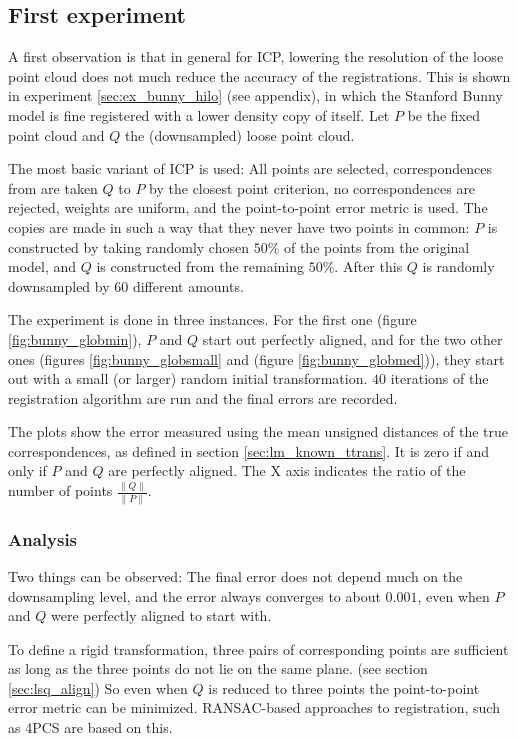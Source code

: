 \subsection{First experiment}
A first observation is that in general for ICP, lowering the resolution of the loose point cloud does not much reduce the accuracy of the registrations. This is shown in experiment \ref{sec:ex_bunny_hilo} (see appendix), in which the Stanford Bunny model is fine registered with a lower density copy of itself. Let $P$ be the fixed point cloud and $Q$ the (downsampled) loose point cloud.

The most basic variant of ICP is used: All points are selected, correspondences from are taken $Q$ to $P$ by the closest point criterion, no correspondences are rejected, weights are uniform, and the point-to-point error metric is used. The copies are made in such a way that they never have two points in common: $P$ is constructed by taking randomly chosen $50\%$ of the points from the original model, and $Q$ is constructed from the remaining $50\%$. After this $Q$ is randomly downsampled by $60$ different amounts.

The experiment is done in three instances. For the first one (figure \ref{fig:bunny_globmin}), $P$ and $Q$ start out perfectly aligned, and for the two other ones (figures \ref{fig:bunny_globsmall} and (figure \ref{fig:bunny_globmed})), they start out with a small (or larger) random initial transformation. $40$ iterations of the registration algorithm are run and the final errors are recorded.

The plots show the error measured using the mean unsigned distances of the true correspondences, as defined in section \ref{sec:lm_known_ttrans}. It is zero if and only if $P$ and $Q$ are perfectly aligned. The X axis indicates the ratio of the number of points $\frac{\|Q\|}{\|P\|}$.


\subsubsection{Analysis}
Two things can be observed: The final error does not depend much on the downsampling level, and the error always converges to about $0.001$, even when $P$ and $Q$ were perfectly aligned to start with.

To define a rigid transformation, three pairs of corresponding points are sufficient as long as the three points do not lie on the same plane. (see section \ref{sec:lsq_align}) So even when $Q$ is reduced to three points the point-to-point error metric can be minimized. RANSAC-based approaches to registration, such as 4PCS are based on this.


